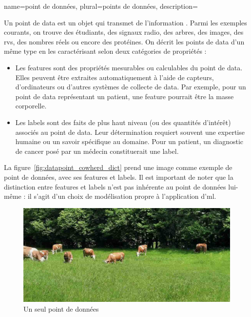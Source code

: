 {name={point de données}, 
	plural={points de données},
	description={Un point de \gls{data} est un objet qui transmet de l'information \cite{coverthomas}. 
		Parmi les exemples courants, on trouve des étudiants, des signaux radio, des arbres, des images, 
		des \glspl{rv}, des nombres réels ou encore des protéines. On décrit les points de \gls{data} d’un même type en les caractérisant selon deux catégories de propriétés :
		\begin{itemize}
			\item Les \glspl{feature} sont des propriétés mesurables ou calculables du point de \gls{data}. 
			Elles peuvent être extraites automatiquement à l’aide de capteurs, d’ordinateurs ou d’autres 
			systèmes de collecte de \gls{data}. Par exemple, pour un point de \gls{data} représentant un patient, 
			une \gls{feature} pourrait être la masse corporelle.
			\item Les \glspl{label} sont des faits de plus haut niveau (ou des quantités d’intérêt) 
			associés au point de \gls{data}. Leur détermination requiert souvent une expertise humaine ou 
			un savoir spécifique au domaine. Pour un patient, un diagnostic de cancer posé par un médecin 
			constituerait une \gls{label}.
		\end{itemize}
		La figure~\ref{fig:datapoint_cowherd_dict} prend une image comme exemple de point de données, 
		avec ses \glspl{feature} et \glspl{label}. Il est important de noter que la distinction entre 
		\glspl{feature} et \glspl{label} n’est pas inhérente au point de données lui-même : 
		il s’agit d’un choix de modélisation propre à l’application d'\gls{ml}.
		\begin{figure}[htbp]
			\centering
			\begin{minipage}[t]{0.95\textwidth}
				\centering
				\includegraphics[width=\textwidth]{../../assets/CowsAustria.jpg}
				\caption*{Un seul point de données}
				\vspace{5mm}

\end{minipage}
\end{figure}}}
